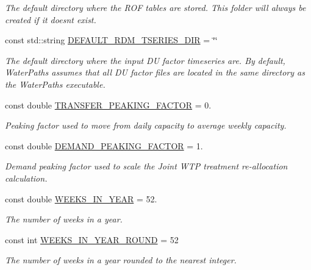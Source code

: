 \begin{DoxyCompactItemize}
\begin{DoxyCompactList}\small\item\em The default directory where the R\+OF tables are stored. This folder will always be created if it doesn\textquotesingle{}t exist. \end{DoxyCompactList}\item 
const std\+::string \mbox{\hyperlink{classConstants_a47e5f6358264d56dc9a22f4c62c68295}{D\+E\+F\+A\+U\+L\+T\+\_\+\+R\+D\+M\+\_\+\+T\+S\+E\+R\+I\+E\+S\+\_\+\+D\+IR}} = \char`\"{}\char`\"{}
\begin{DoxyCompactList}\small\item\em The default directory where the input DU factor timeseries are. By default, Water\+Paths assumes that all DU factor files are located in the same directory as the Water\+Paths executable. \end{DoxyCompactList}\item 
const double \mbox{\hyperlink{classConstants_aa0186cda755aa12c57aedc70baba06e3}{T\+R\+A\+N\+S\+F\+E\+R\+\_\+\+P\+E\+A\+K\+I\+N\+G\+\_\+\+F\+A\+C\+T\+OR}} = 0.
\begin{DoxyCompactList}\small\item\em Peaking factor used to move from daily capacity to average weekly capacity. \end{DoxyCompactList}\item 
const double \mbox{\hyperlink{classConstants_ada485574f11df42b67a01018139b95f8}{D\+E\+M\+A\+N\+D\+\_\+\+P\+E\+A\+K\+I\+N\+G\+\_\+\+F\+A\+C\+T\+OR}} = 1.
\begin{DoxyCompactList}\small\item\em Demand peaking factor used to scale the Joint W\+TP treatment re-\/allocation calculation. \end{DoxyCompactList}\item 
const double \mbox{\hyperlink{classConstants_a19e84af3cbc6e1318beb22408c2a1f2f}{W\+E\+E\+K\+S\+\_\+\+I\+N\+\_\+\+Y\+E\+AR}} = 52.
\begin{DoxyCompactList}\small\item\em The number of weeks in a year. \end{DoxyCompactList}\item 
const int \mbox{\hyperlink{classConstants_aa20160c39be15e5da1535608aaa0647c}{W\+E\+E\+K\+S\+\_\+\+I\+N\+\_\+\+Y\+E\+A\+R\+\_\+\+R\+O\+U\+ND}} = 52
\begin{DoxyCompactList}\small\item\em The number of weeks in a year rounded to the nearest integer. \end{DoxyCompactList}\item 

\end{DoxyCompactItemize}
